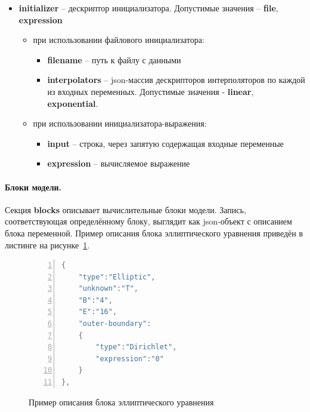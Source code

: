 \begin{itemize}
    \begin{itemize}
        \item \textbf{initializer} -- дескриптор инициализатора. Допустимые 
        значения -- \textbf{file}, \textbf{expression}
        \begin{itemize}
            \item при использовании файлового инициализатора:
            \begin{itemize}
                \item \textbf{filename} -- путь к файлу с данными
                \item \textbf{interpolators} -- json-массив дескрипторов 
                интерполяторов по каждой из входных переменных. Допустимые 
                значения - \textbf{linear}, \textbf{exponential}.
            \end{itemize}
        \end{itemize}
        \begin{itemize}
            \item при использовании инициализатора-выражения:
            \begin{itemize}
                \item \textbf{input} -- строка, через запятую содержащая 
                входные переменные
                \item \textbf{expression} -- вычисляемое выражение
            \end{itemize}
        \end{itemize}
    \end{itemize}
\end{itemize}

\paragraph{Блоки модели.} Секция \textbf{blocks} описывает 
вычислительные блоки модели. Запись, соответствующая определённому блоку, 
выглядит как json-объект с описанием блока переменной. Пример описания блока 
эллиптического уравнения приведён в листинге на рисунке~\ref{fig:lstBlock}.

\begin{figure}
    \centering
    \begin{lstlisting}[language=java,frame=single,numbers=left,breaklines=true]
{
    "type":"Elliptic",
    "unknown":"T",
    "B":"4",
    "E":"16",
    "outer-boundary":
    {
        "type":"Dirichlet",
        "expression":"0"
    }
},
    \end{lstlisting}
    \caption{Пример описания блока эллиптического уравнения}
    \label{fig:lstBlock}
\end{figure}

